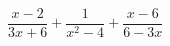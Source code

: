 \begin{ex}[type=expression]
	\begin{condition}
		\(\dfrac{x-2}{3x+6}+\dfrac{1}{x^2-4}+\dfrac{x-6}{6-3x}\)
	\end{condition}
\end{ex}